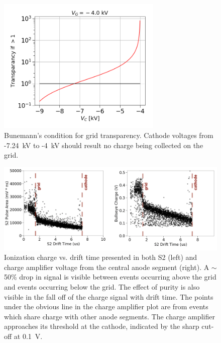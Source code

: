 \begin{figure}[htbp]
\begin{center}
\includegraphics[width=0.7\textwidth]{figures/etrains/bune.png}
\caption{Bunemann's condition for grid transparency. Cathode voltages from -7.24~kV to -4~kV should result no charge being collected on the grid.}
\label{fig:bune}
\end{center}
\end{figure}

\begin{figure}[htbp]
\begin{center}
\includegraphics[width=\textwidth]{figures/etrains/s2_charge_vs_drift.png}
\caption{Ionization charge vs. drift time presented in both S2 (left) and charge amplifier voltage from the central anode segment (right). A $\sim$50\% drop in signal is visible between events occurring above the grid and events occurring below the grid. The effect of purity is also visible in the fall off of the charge signal with drift time. The points under the obvious line in the charge amplifier plot are from events which share charge with other anode segments. The charge amplifier approaches its threshold at the cathode, indicated by the sharp cut-off at 0.1~V.}
\label{fig:charge_vs_drift}
\end{center}
\end{figure}

